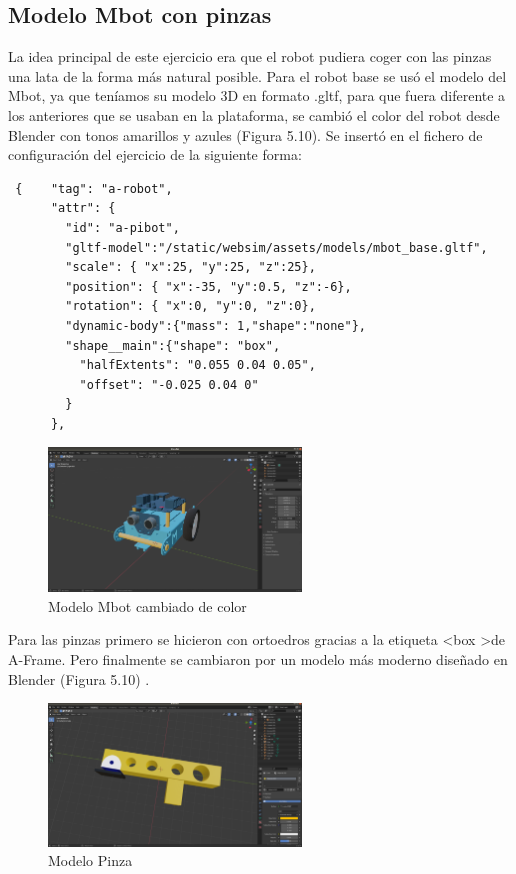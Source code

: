 \subsection{Modelo Mbot con pinzas}
La idea principal de este ejercicio era que el robot pudiera coger con las pinzas una lata de la forma más natural posible.
Para el robot base se usó el modelo del Mbot, ya que teníamos su  modelo 3D en formato .gltf, para que fuera diferente a los anteriores que se usaban en la plataforma, se cambió el color del robot desde Blender con tonos amarillos y azules (Figura 5.10). Se insertó en el fichero de configuración del ejercicio de la siguiente forma:

\begin{lstlisting}
 {    "tag": "a-robot",
      "attr": {
        "id": "a-pibot",
        "gltf-model":"/static/websim/assets/models/mbot_base.gltf",
        "scale": { "x":25, "y":25, "z":25},
        "position": { "x":-35, "y":0.5, "z":-6},
        "rotation": { "x":0, "y":0, "z":0},
        "dynamic-body":{"mass": 1,"shape":"none"},
        "shape__main":{"shape": "box",
          "halfExtents": "0.055 0.04 0.05",
          "offset": "-0.025 0.04 0"
        }
      },
\end{lstlisting}

\begin{figure}[H]
  \centering
  \includegraphics[width=0.6\textwidth]{chapters/images/mbotbase.png}
	\caption{Modelo Mbot cambiado de color}  
\end{figure}


Para las pinzas  primero se hicieron con ortoedros gracias a la etiqueta  \textless box \textgreater de A-Frame. Pero finalmente se cambiaron por un modelo más moderno diseñado en Blender (Figura 5.10) .

\begin{figure}[H]
  \centering
    \includegraphics[width=0.6\textwidth]{chapters/images/pinza.png}
	\caption{Modelo Pinza}    
\end{figure}


